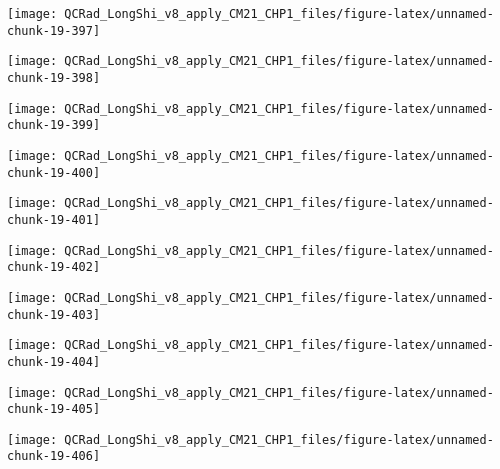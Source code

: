 \documentclass[
  10pt,
  a4paper,oneside]{article}
\begin{document}
\begin{center}\texttt{[image: QCRad\_LongShi\_v8\_apply\_CM21\_CHP1\_files/figure-latex/unnamed-chunk-19-397]} \end{center}

\begin{center}\texttt{[image: QCRad\_LongShi\_v8\_apply\_CM21\_CHP1\_files/figure-latex/unnamed-chunk-19-398]} \end{center}

\begin{center}\texttt{[image: QCRad\_LongShi\_v8\_apply\_CM21\_CHP1\_files/figure-latex/unnamed-chunk-19-399]} \end{center}

\begin{center}\texttt{[image: QCRad\_LongShi\_v8\_apply\_CM21\_CHP1\_files/figure-latex/unnamed-chunk-19-400]} \end{center}

\begin{center}\texttt{[image: QCRad\_LongShi\_v8\_apply\_CM21\_CHP1\_files/figure-latex/unnamed-chunk-19-401]} \end{center}

\begin{center}\texttt{[image: QCRad\_LongShi\_v8\_apply\_CM21\_CHP1\_files/figure-latex/unnamed-chunk-19-402]} \end{center}

\begin{center}\texttt{[image: QCRad\_LongShi\_v8\_apply\_CM21\_CHP1\_files/figure-latex/unnamed-chunk-19-403]} \end{center}

\begin{center}\texttt{[image: QCRad\_LongShi\_v8\_apply\_CM21\_CHP1\_files/figure-latex/unnamed-chunk-19-404]} \end{center}

\begin{center}\texttt{[image: QCRad\_LongShi\_v8\_apply\_CM21\_CHP1\_files/figure-latex/unnamed-chunk-19-405]} \end{center}

\begin{center}\texttt{[image: QCRad\_LongShi\_v8\_apply\_CM21\_CHP1\_files/figure-latex/unnamed-chunk-19-406]} \end{center}
\end{document}
